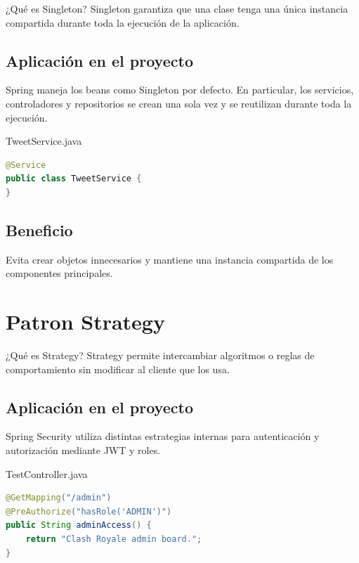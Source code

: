 \documentclass[12pt,a4paper]{article}
\begin{document}
\begin{patternbox}{¿Qué es Singleton?}
Singleton garantiza que una clase tenga una única instancia compartida
durante toda la ejecución de la aplicación.
\end{patternbox}

\subsection{Aplicación en el proyecto}

Spring maneja los beans como Singleton por defecto.  
En particular, los servicios, controladores y repositorios se crean una sola vez
y se reutilizan durante toda la ejecución.

\begin{filebox}{TweetService.java}
\begin{lstlisting}[language=Java]
@Service
public class TweetService {
}
\end{lstlisting}
\end{filebox}

\subsection{Beneficio}
Evita crear objetos innecesarios y mantiene una instancia compartida de los componentes principales.

\section{Patron Strategy}

\begin{patternbox}{¿Qué es Strategy?}
Strategy permite intercambiar algoritmos o reglas de comportamiento
sin modificar al cliente que los usa.
\end{patternbox}

\subsection{Aplicación en el proyecto}

Spring Security utiliza distintas estrategias internas para autenticación
y autorización mediante JWT y roles.

\begin{filebox}{TestController.java}
\begin{lstlisting}[language=Java]
@GetMapping("/admin")
@PreAuthorize("hasRole('ADMIN')")
public String adminAccess() {
    return "Clash Royale admin board.";
}
\end{lstlisting}
\end{filebox}
\end{document}
